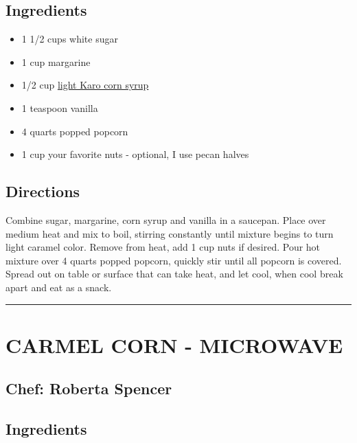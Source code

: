 \documentclass[
]{book}
\providecommand{\tightlist}{%
  \setlength{\itemsep}{0pt}\setlength{\parskip}{0pt}}
\begin{document}
\hypertarget{ingredients-98}{%
\subsection*{Ingredients}\label{ingredients-98}}


\begin{itemize}
\tightlist
\item
  1 1/2 cups white sugar
\item
  1 cup margarine
\item
  1/2 cup \href{https://en.wikipedia.org/wiki/Corn_syrup}{light Karo corn syrup}
\item
  1 teaspoon vanilla
\item
  4 quarts popped popcorn
\item
  1 cup your favorite nuts - optional, I use pecan halves
\end{itemize}

\hypertarget{directions-98}{%
\subsection*{Directions}\label{directions-98}}


Combine sugar, margarine, corn syrup and vanilla in a saucepan. Place over medium heat and mix to boil, stirring constantly until mixture begins to turn light caramel color. Remove from heat, add 1 cup nuts if desired. Pour hot mixture over 4 quarts popped popcorn, quickly stir until all popcorn is covered. Spread out on table or surface that can take heat, and let cool, when cool break apart and eat as a snack.

\begin{center}\rule{0.5\linewidth}{0.5pt}\end{center}

\hypertarget{carmel-corn---microwave}{%
\section*{CARMEL CORN - MICROWAVE}\label{carmel-corn---microwave}}


\hypertarget{chef-roberta-spencer-35}{%
\subsection*{Chef: Roberta Spencer}\label{chef-roberta-spencer-35}}


\hypertarget{ingredients-99}{%
\subsection*{Ingredients}\label{ingredients-99}}
\end{document}
